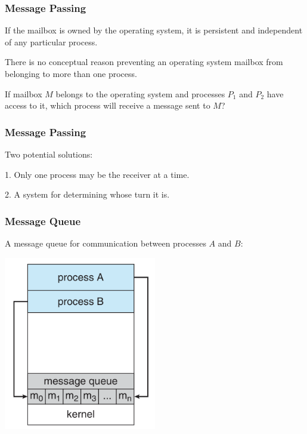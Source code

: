 \begin{frame}
\frametitle{Message Passing}

If the mailbox is owned by the operating system, it is persistent and independent of any particular process. 

There is no conceptual reason preventing an operating system mailbox from belonging to more than one process. 

If mailbox $M$ belongs to the operating system and processes $P_{1}$ and $P_{2}$ have access to it, which process will receive a message sent to $M$?

\end{frame}

\begin{frame}
\frametitle{Message Passing}

Two potential solutions:

1. Only one process may be the receiver at a time.

2. A system for determining whose turn it is.

\end{frame}

\begin{frame}
\frametitle{Message Queue}
A message queue for communication between processes $A$ and $B$:
\begin{center}
	\includegraphics[width=0.5\textwidth]{images/message-passing.png}
\end{center}

\end{frame}

